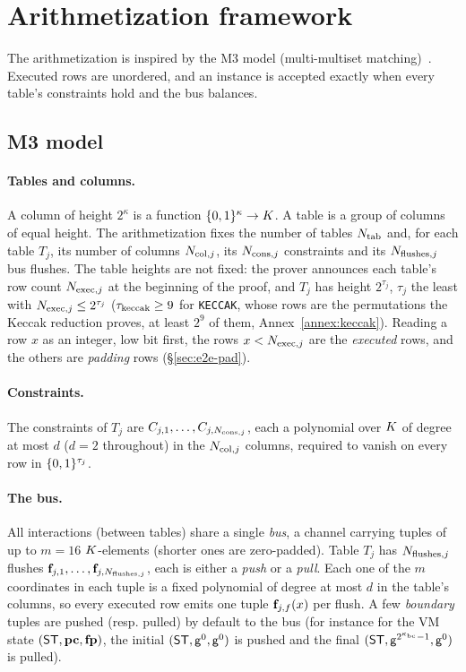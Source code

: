 \section{Arithmetization framework}\label{sec:arith}

The arithmetization is inspired by the M3 model (multi-multiset matching)~\cite{m3}. Executed rows are unordered, and an instance is accepted exactly when every table's constraints hold and the bus balances.

\subsection{M3 model}\label{sec:m3}

\paragraph{Tables and columns.} A column of height $2^{\kappa}$ is a function $\{0,1\}^{\kappa}\to K$. A table is a group of columns of equal height. The arithmetization fixes the number of tables $N_{\mathrm{tab}}$ and, for each table $T_j$, its number of columns $N_{\mathrm{col},j}$, its $N_{\mathrm{cons},j}$ constraints and its $N_{\mathrm{flushes},j}$ bus flushes. The table heights are not fixed: the prover announces each table's row count $N_{\mathrm{exec},j}$ at the beginning of the proof, and $T_j$ has height $2^{\tau_j}$, $\tau_j$ the least with $N_{\mathrm{exec},j}\le2^{\tau_j}$ ($\tau_{\mathrm{keccak}}\ge9$ for \texttt{KECCAK}, whose rows are the permutations the Keccak reduction proves, at least $2^9$ of them, Annex~\ref{annex:keccak}). Reading a row $x$ as an integer, low bit first, the rows $x<N_{\mathrm{exec},j}$ are the \emph{executed} rows, and the others are \emph{padding} rows (\S\ref{sec:e2e-pad}).

\paragraph{Constraints.} The constraints of $T_j$ are $C_{j,1},\dots,C_{j,N_{\mathrm{cons},j}}$, each a polynomial over $K$ of degree at most $d$ ($d=2$ throughout) in the $N_{\mathrm{col},j}$ columns, required to vanish on every row in $\{0,1\}^{\tau_j}$.

\paragraph{The bus.} All interactions (between tables) share a single \emph{bus}, a channel carrying tuples of up to $m=16$ $K$-elements (shorter ones are zero-padded). Table $T_j$ has $N_{\mathrm{flushes},j}$ flushes $\mathbf{f}_{j,1},\dots,\mathbf{f}_{j,N_{\mathrm{flushes},j}}$, each is either a \emph{push} or a \emph{pull}. Each one of the $m$ coordinates in each tuple is a fixed polynomial of degree at most $d$ in the table's columns, so every executed row emits one tuple $\mathbf{f}_{j,f}(x)$ per flush. A few \emph{boundary} tuples are pushed (resp. pulled) by default to the bus (for instance for the VM state $(\mathsf{ST}, \mathbf{pc}, \mathbf{fp})$, the initial $(\mathsf{ST}, \mathsf{g}^0, \mathsf{g}^0)$ is pushed and the final $(\mathsf{ST}, \mathsf{g}^{2^{\kappa_{\mathrm{bc}}}-1}, \mathsf{g}^{0})$ is pulled).

